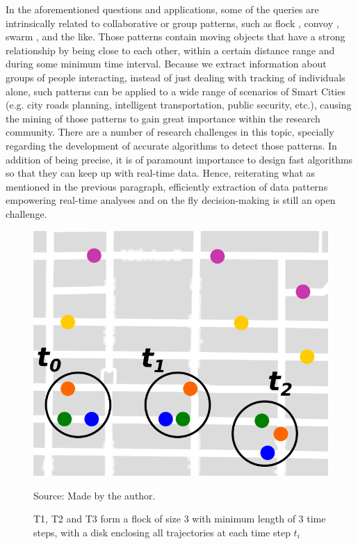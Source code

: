 In the aforementioned questions and applications, some of the queries are intrinsically related to collaborative or
group patterns, such as flock \citep{gudefficient}, convoy \citep{convoy}, swarm \citep{swarm}, and the like. Those
patterns contain moving objects that have a strong relationship by being close to each other, within a certain distance
range and during some minimum time interval. Because we extract information about groups of people interacting, instead
of just dealing with tracking of individuals alone, such patterns can be applied to a wide range of scenarios of Smart
Cities (e.g. city roads planning, intelligent transportation, public security, etc.), causing the mining of those
patterns to gain great importance within the research community. There are a number of research challenges in this
topic, specially regarding the development of accurate algorithms to detect those patterns. In addition of being
precise, it is of paramount importance to design fast algorithms so that they can keep up with real-time data. Hence,
reiterating what as mentioned in the previous paragraph, efficiently extraction of data patterns empowering real-time
analyses and on the fly decision-making is still an open challenge.

\begin{figure}[h!]
    \centering
    \caption{T1, T2 and T3 form a flock of size 3 with minimum length of 3 time steps, with a disk enclosing all
        trajectories at each time step $t_i$}
    \centerline{\includegraphics[width=0.7\linewidth]{images/flock_pattern.png}}
    \footnotesize{Source: Made by the author.}
    \label{fig:flocks}
\end{figure}

